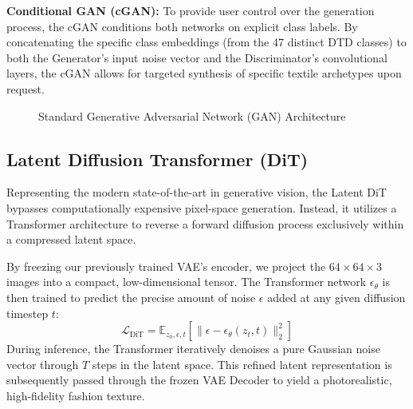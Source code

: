 \documentclass[12pt,a4paper]{article}
\begin{document}
\textbf{Conditional GAN (cGAN):}
To provide user control over the generation process, the cGAN conditions both networks on explicit class labels. By concatenating the specific class embeddings (from the 47 distinct DTD classes) to both the Generator's input noise vector and the Discriminator's convolutional layers, the cGAN allows for targeted synthesis of specific textile archetypes upon request.

\begin{figure}[H]
\centering
{}
\caption{Standard Generative Adversarial Network (GAN) Architecture}
\end{figure}

\subsection{Latent Diffusion Transformer (DiT)}
Representing the modern state-of-the-art in generative vision, the Latent DiT bypasses computationally expensive pixel-space generation. Instead, it utilizes a Transformer architecture to reverse a forward diffusion process exclusively within a compressed latent space.

By freezing our previously trained VAE's encoder, we project the $64 \times 64 \times 3$ images into a compact, low-dimensional tensor. The Transformer network $\epsilon_\theta$ is then trained to predict the precise amount of noise $\epsilon$ added at any given diffusion timestep $t$:
\begin{equation}
    \mathcal{L}_{\text{DiT}} = \mathbb{E}_{z_0, \epsilon, t} [ \| \epsilon - \epsilon_\theta(z_t, t) \|_2^2 ]
\end{equation}
During inference, the Transformer iteratively denoises a pure Gaussian noise vector through $T$ steps in the latent space. This refined latent representation is subsequently passed through the frozen VAE Decoder to yield a photorealistic, high-fidelity fashion texture.
\end{document}

